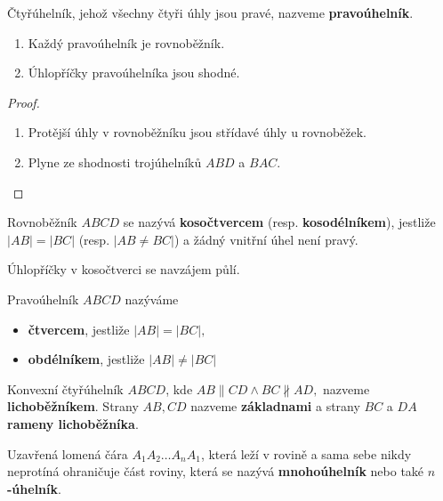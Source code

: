 \begin{definition}
  Čtyřúhelník, jehož všechny čtyři úhly jsou pravé, nazveme \textbf{pravoúhelník}.
\end{definition}

\begin{veta}
  \begin{enumerate}[$i.$]
    \item Každý pravoúhelník je rovnoběžník.
    \item Úhlopříčky pravoúhelníka jsou shodné.
  \end{enumerate}
\end{veta}

\begin{proof}
  \begin{enumerate}[$i.$]
    \item Protější úhly v rovnoběžníku jsou střídavé úhly u rovnoběžek.
    \item Plyne ze shodnosti trojúhelníků $ABD$ a $BAC$.\qedhere
  \end{enumerate}
\end{proof}

\begin{definition}
  Rovnoběžník $ABCD$ se nazývá \textbf{kosočtvercem} (resp. \textbf{kosodélníkem}), jestliže $|AB|=|BC|$ (resp. $|AB\ne BC|$) a žádný vnitřní úhel není pravý.
\end{definition}


\begin{veta}
  Úhlopříčky v kosočtverci se navzájem půlí.
\end{veta}

\begin{definition}
  Pravoúhelník $ABCD$ nazýváme
  \begin{itemize}
    \item \textbf{čtvercem}, jestliže $|AB|=|BC|,$
    \item \textbf{obdélníkem}, jestliže $|AB| \ne |BC|$
  \end{itemize}
\end{definition}

\begin{definition}
  Konvexní čtyřúhelník $ABCD$, kde $AB \parallel CD \land BC \nparallel AD,$ nazveme \textbf{lichoběžníkem}. Strany $AB, CD$ nazveme \textbf{základnami} a strany $BC$ a $DA$ \textbf{rameny lichoběžníka}.
\end{definition}

\begin{definition}
  Uzavřená lomená čára $A_1A_2\dots A_nA_1$, která leží v rovině a sama sebe nikdy neprotíná ohraničuje část roviny, která se nazývá \textbf{mnohoúhelník} nebo také \textbf{$n$-úhelník}.
\end{definition}

